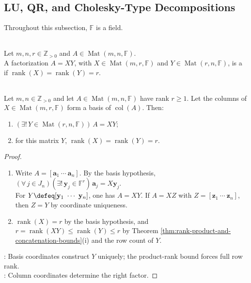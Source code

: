 \subsection{LU, QR, and Cholesky-Type Decompositions}

Throughout this subsection, $\mathbb{F}$ is a field.

\begin{definition} \label{def:full-rank-factorization} \\
Let $m,n,r\in\mathbb{Z}_{>0}$ and $A\in\operatorname{Mat}(m,n,\mathbb{F})$.\\
A factorization $A=XY$, with $X\in\operatorname{Mat}(m,r,\mathbb{F})$ and $Y\in\operatorname{Mat}(r,n,\mathbb{F})$, is a  if $\operatorname{rank}(X)=\operatorname{rank}(Y)=r$.
\end{definition}

\begin{theorem} \label{thm:full-rank-factorization} \\
Let $m,n\in\mathbb{Z}_{>0}$ and let $A\in\operatorname{Mat}(m,n,\mathbb{F})$ have rank $r\geq1$. Let the columns of $X\in\operatorname{Mat}(m,r,\mathbb{F})$ form a basis of $\operatorname{col}(A)$. Then:
\begin{enumerate}[label=(\roman*)]
\setlength{\itemsep}{0pt}
\item $(\exists!\,Y\in\operatorname{Mat}(r,n,\mathbb{F}))\,A=XY$;
\item for this matrix $Y$, $\operatorname{rank}(X)=\operatorname{rank}(Y)=r$.
\end{enumerate}
\begin{proof}
\begin{enumerate}[label=(\roman*)]
\setlength{\itemsep}{0pt}
\item Write $A=[\mathbf{a}_1\ \cdots\ \mathbf{a}_n]$. By the basis hypothesis, $(\forall\,j\in J_n)(\exists!\,\mathbf{y}_j\in\mathbb{F}^r)\,\mathbf{a}_j=X\mathbf{y}_j$.\\
For $Y\defeq[\mathbf{y}_1\ \cdots\ \mathbf{y}_n]$, one has $A=XY$. If $A=XZ$ with $Z=[\mathbf{z}_1\ \cdots\ \mathbf{z}_n]$, then $Z=Y$ by coordinate uniqueness.
\item $\operatorname{rank}(X)=r$ by the basis hypothesis, and $r=\operatorname{rank}(XY)\leq\operatorname{rank}(Y)\leq r$ by Theorem \ref{thm:rank-product-and-concatenation-bounds}(i) and the row count of $Y$.
\end{enumerate}
: Basis coordinates construct $Y$ uniquely; the product-rank bound forces full row rank.\\
: Column coordinates determine the right factor.
\end{proof}
\end{theorem}

